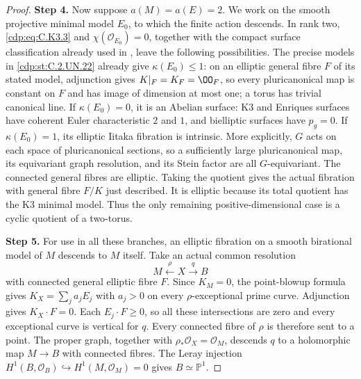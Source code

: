 \begin{proof}
\noindent\textbf{Step 4.} Now suppose $a(M)=a(E)=2$. We work on the smooth
projective minimal model $E_0$, to which the finite
action descends. In rank two, \eqref{cdp:eq:C.K3.3} and
$\chi(\mathcal O_{E_0})=0$, together with the compact
surface classification already used in 
\cite[Chapter~1, Theorem~3.1, p.~10]{Peters1990}, leave the following
possibilities. The precise models in \ref{cdp:st:C.2.UN.22}
already give $\kappa(E_0)\le1$: on an elliptic general fibre
$F$ of its stated model, adjunction gives
$K|_F=K_F=\OO_F$, so every pluricanonical map is constant
on $F$ and has image of dimension at most one; a torus
has trivial canonical line. If $\kappa(E_0)=0$, it is an Abelian
surface: K3 and Enriques surfaces have coherent Euler
characteristic $2$ and $1$, and bielliptic surfaces have
$p_g=0$. If $\kappa(E_0)=1$, its elliptic Iitaka
fibration is intrinsic. More explicitly, $G$ acts on
each space of pluricanonical sections, so a sufficiently
large pluricanonical map, its equivariant graph resolution,
and its Stein factor are all $G$-equivariant. The
connected general fibres are elliptic. Taking the
quotient gives the actual fibration with general fibre
$F/K$ just described. It is elliptic because its total
quotient has the K3 minimal model. Thus the only
remaining positive-dimensional case is a cyclic quotient
of a two-torus.

\noindent\textbf{Step 5.} For use in all these branches, an elliptic fibration on
a smooth birational model of $M$ descends to $M$ itself.
Take an actual common resolution
\[
                  M\xleftarrow{\rho}X\xrightarrow{q}B
                                                               \tag{C.K3.5}\label{cdp:eq:C.K3.5}
\]
with connected general elliptic fibre $F$. Since $K_M=0$,
the point-blowup formula gives
$K_X=\sum_j a_jE_j$ with $a_j>0$ on every
$\rho$-exceptional prime curve. Adjunction gives
$K_X\cdot F=0$. Each $E_j\cdot F\ge0$, so all these
intersections are zero and every exceptional curve is
vertical for $q$. Every connected fibre of $\rho$ is
therefore sent to a point. The proper graph, together
with $\rho_*\mathcal O_X=\mathcal O_M$, descends $q$
to a holomorphic map $M\to B$ with connected fibres.
The Leray injection
$H^1(B,\mathcal O_B)\hookrightarrow H^1(M,\mathcal O_M)=0$
gives $B\simeq\mathbb P^1$.


\end{proof}
